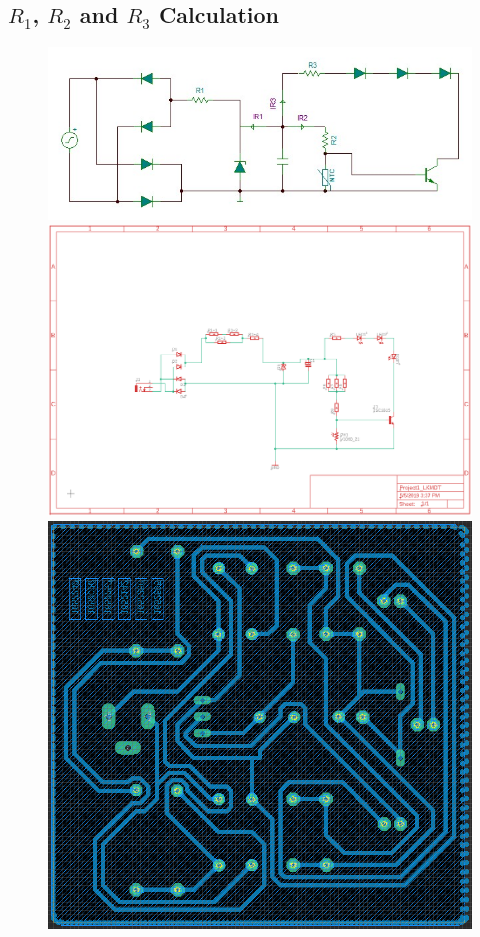 \documentclass[12pt]{extarticle}
\newcommand{\<}{\langle}
\renewcommand{\>}{\rangle}
\theoremstyle{definition}
\begin{document}
\subsection{$R_1$, $R_2$ and $R_3$ Calculation}
\begin{figure}[ht]
		\begin{center}
			
			\includegraphics[scale=0.75]{PROJECT.JPG}\\[0,5cm]
			\includegraphics[scale=0.5]{sch.PNG}\\[0,5cm]
			\includegraphics[scale=0.5]{Board.PNG}\\[0,5cm]
		\end{center}
\end{figure}
\end{document}
